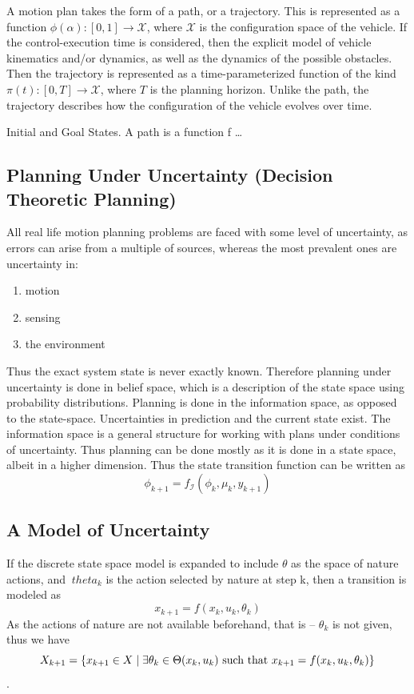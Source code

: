 A motion plan takes the form of a path, or a trajectory. This is represented as
a function \(\phi(\alpha) \colon [0,1] \rightarrow \mathcal{X}\), where
\(\mathcal{X}\) is the configuration space of the vehicle. If the
control-execution time is considered, then the explicit model of vehicle
kinematics and/or dynamics, as well as the dynamics of the possible obstacles.
Then the trajectory is represented as a time-parameterized function of the kind
\(\pi(t) \colon [0,T] \rightarrow \mathcal{X}\), where \(T\) is the planning
horizon. Unlike the path, the trajectory describes how the configuration of the
vehicle evolves over time.

Initial and Goal States. A path is a function f \ldots

\subsection{Planning Under Uncertainty (Decision Theoretic Planning)}

All real life motion planning problems are faced with some level of uncertainty,
as errors can arise from a multiple of sources, whereas the most prevalent ones
are uncertainty in:
\begin{enumerate}
\item motion
\item sensing
\item the environment
\end{enumerate}
Thus the exact system state is never exactly known. Therefore planning under
uncertainty is done in belief space, which is a description of the state space
using probability distributions. Planning is done in the information space, as
opposed to the state-space. Uncertainties in prediction and the current state
exist. The information space is a general structure for working with plans under
conditions of uncertainty. Thus planning can be done mostly as it is done in a
state space, albeit in a higher dimension. Thus the state transition function
can be written as
\[
  \phi_{k+1} = f_{\mathcal{I}}\left( \phi_k, \mu_k, y_{k+1} \right)
\]

\subsection{A Model of Uncertainty}

If the discrete state space model is expanded to include \(\theta\) as the space
of nature actions, and \(\ theta_k\) is the action selected by nature at step k,
then a transition is modeled as
\[
  x_{k+1} = f(x_k,u_k,\theta_k)
\]
As the actions of nature are not available beforehand, that is -- \(\theta_ k\)
is not given, thus we have
\[
  X_{k+1} = \lbrace x_{k+1} \in X \mid \exists\theta_k \in \Theta(x_k,u_k)
    \text{ such that } x_{k+1} = f(x_k,u_k,\theta_k)\rbrace
\]\cite{Lav06}.

